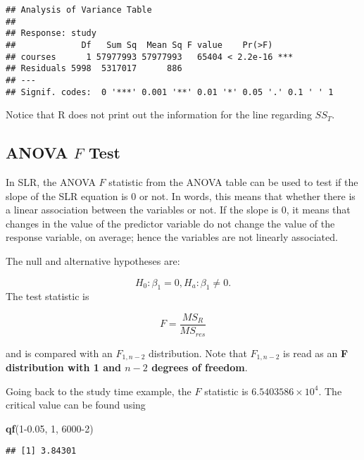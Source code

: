 \documentclass[
]{book}
\newenvironment{Shaded}{\begin{snugshade}}{\end{snugshade}}
\newcommand{\DecValTok}[1]{\textcolor[rgb]{0.00,0.00,0.81}{#1}}
\newcommand{\FloatTok}[1]{\textcolor[rgb]{0.00,0.00,0.81}{#1}}
\newcommand{\FunctionTok}[1]{\textcolor[rgb]{0.13,0.29,0.53}{\textbf{#1}}}
\newcommand{\NormalTok}[1]{#1}
\begin{document}
\begin{verbatim}
## Analysis of Variance Table
## 
## Response: study
##             Df   Sum Sq  Mean Sq F value    Pr(>F)    
## courses      1 57977993 57977993   65404 < 2.2e-16 ***
## Residuals 5998  5317017      886                      
## ---
## Signif. codes:  0 '***' 0.001 '**' 0.01 '*' 0.05 '.' 0.1 ' ' 1
\end{verbatim}

Notice that R does not print out the information for the line regarding \(SS_T\).

\hypertarget{anova-f-test}{%
\subsection{\texorpdfstring{ANOVA \(F\) Test}{ANOVA F Test}}\label{anova-f-test}}

In SLR, the ANOVA \(F\) statistic from the ANOVA table can be used to test if the slope of the SLR equation is 0 or not. In words, this means that whether there is a linear association between the variables or not. If the slope is 0, it means that changes in the value of the predictor variable do not change the value of the response variable, on average; hence the variables are not linearly associated.

The null and alternative hypotheses are:

\[
H_0: \beta_1 = 0, H_a: \beta_1 \neq 0.
\]
The test statistic is

\begin{equation} \label{eq:ANOVA}
F = \frac{MS_R}{MS_{res}}
\end{equation}

and is compared with an \(F_{1,n-2}\) distribution. Note that \(F_{1,n-2}\) is read as an \textbf{F distribution with 1 and \(n-2\) degrees of freedom}.

Going back to the study time example, the \(F\) statistic is \ensuremath{6.5403586\times 10^{4}}. The critical value can be found using

\begin{Shaded}
\begin{Highlighting}[]
\FunctionTok{qf}\NormalTok{(}\DecValTok{1}\FloatTok{{-}0.05}\NormalTok{, }\DecValTok{1}\NormalTok{, }\DecValTok{6000{-}2}\NormalTok{)}
\end{Highlighting}
\end{Shaded}

\begin{verbatim}
## [1] 3.84301
\end{verbatim}
\end{document}
